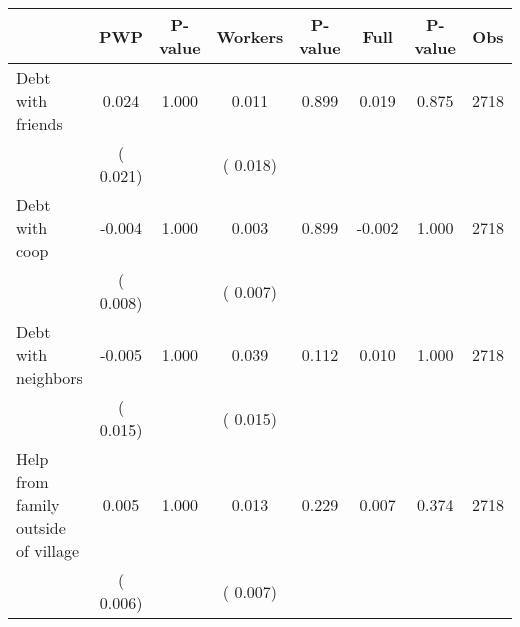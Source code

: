 
\begin{tabular}{l*{7}{c}}\hline&\multicolumn{1}{c}{PWP}&\multicolumn{1}{c}{P-value}&\multicolumn{1}{c}{Workers}&\multicolumn{1}{c}{P-value}&\multicolumn{1}{c}{Full}&\multicolumn{1}{c}{P-value}&\multicolumn{1}{c}{Obs} \\ \hline

 Debt with friends       &              0.024       &        1.000  &              0.011       &        0.899  &              0.019       &              0.875 &  2718 \\ 
                       &       (       0.021)             &                               &       (       0.018)                     &                               &                                               &                                &                      \\ 

 Debt with coop       &             -0.004       &        1.000  &              0.003       &        0.899  &             -0.002       &              1.000 &  2718 \\ 
                       &       (       0.008)             &                               &       (       0.007)                     &                               &                                               &                                &                      \\ 

 Debt with neighbors       &             -0.005       &        1.000  &              0.039       &        0.112  &              0.010       &              1.000 &  2718 \\ 
                       &       (       0.015)             &                               &       (       0.015)                     &                               &                                               &                                &                      \\ 

 Help from family outside of village       &              0.005       &        1.000  &              0.013       &        0.229  &              0.007       &              0.374 &  2718 \\ 
                       &       (       0.006)             &                               &       (       0.007)                     &                               &                                               &                                &                      \\ 


\end{tabular}
